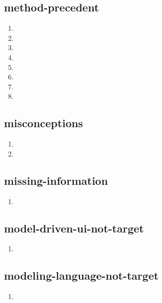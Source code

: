 \documentclass{article}
\begin{document}
\subsection{method-precedent}
\begin{enumerate}
\item {}
\item {}
\item {}
\item {}
\item {}
\item {}
\item {}
\item {}
\end{enumerate}

\subsection{misconceptions}
\begin{enumerate}
\item {}
\item {}
\end{enumerate}

\subsection{missing-information}
\begin{enumerate}
\item {}
\end{enumerate}

\subsection{model-driven-ui-not-target}
\begin{enumerate}
\item {}
\end{enumerate}

\subsection{modeling-language-not-target}
\begin{enumerate}
\item {}
\end{enumerate}
\end{document}
